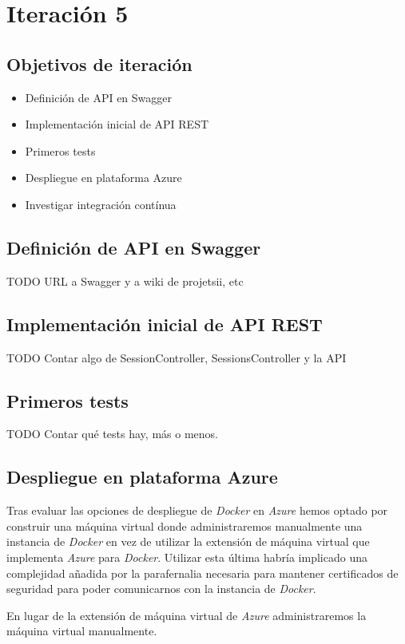 \chapter{Iteración 5}
\section{Objetivos de iteración}
\begin{itemize}
  \item Definición de API en Swagger
  \item Implementación inicial de API REST
  \item Primeros tests
  \item Despliegue en plataforma Azure
  \item Investigar integración contínua
\end{itemize}


\section{Definición de API en Swagger}
TODO URL a Swagger y a wiki de projetsii, etc


\section{Implementación inicial de API REST}
TODO Contar algo de SessionController, SessionsController y la API


\section{Primeros tests}
TODO  Contar qué tests hay, más o menos.


\section{Despliegue en plataforma Azure}
Tras evaluar las opciones de despliegue de \emph{Docker} en \emph{Azure} hemos
optado por construir una máquina virtual donde administraremos manualmente una
instancia de \emph{Docker} en vez de utilizar la extensión de máquina virtual
que implementa \emph{Azure} para \emph{Docker}. Utilizar esta última habría implicado
una complejidad añadida por la parafernalia necesaria para mantener certificados de
seguridad para poder comunicarnos con la instancia de  \emph{Docker}.

En lugar de la extensión de máquina virtual de \emph{Azure} administraremos la 
máquina virtual manualmente.


